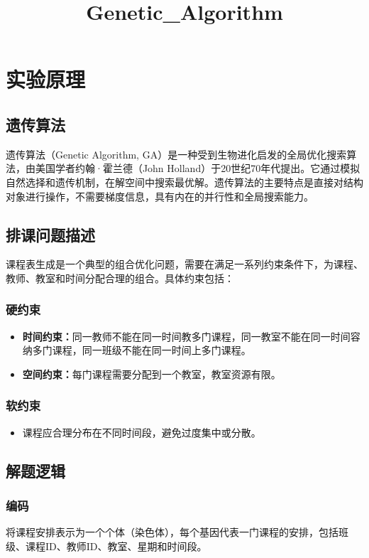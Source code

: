 \documentclass{ctexart}
\title{Genetic_Algorithm}
\author{}
\date{}
\begin{document}
	\large
	\maketitle
	\vspace{-50pt}
	\section{实验原理}
	\subsection{遗传算法}
	遗传算法（Genetic Algorithm, GA）是一种受到生物进化启发的全局优化搜索算法，由美国学者约翰·霍兰德（John Holland）于20世纪70年代提出。它通过模拟自然选择和遗传机制，在解空间中搜索最优解。遗传算法的主要特点是直接对结构对象进行操作，不需要梯度信息，具有内在的并行性和全局搜索能力。
	\subsection{排课问题描述}
	课程表生成是一个典型的组合优化问题，需要在满足一系列约束条件下，为课程、教师、教室和时间分配合理的组合。具体约束包括：
	\vspace{-10pt}
	\subsubsection{硬约束}
	\begin{itemize}[label=\textbullet]
		\item \textbf{时间约束：}同一教师不能在同一时间教多门课程，同一教室不能在同一时间容纳多门课程，同一班级不能在同一时间上多门课程。
		\item \textbf{空间约束：}每门课程需要分配到一个教室，教室资源有限。
	\end{itemize}
	\vspace{-20pt}
	\subsubsection{软约束}
	\begin{itemize}[label=\textbullet]
		\item 课程应合理分布在不同时间段，避免过度集中或分散。
	\end{itemize}
	
	\subsection{解题逻辑}
	\subsubsection{编码}
	将课程安排表示为一个个体（染色体），每个基因代表一门课程的安排，包括班级、课程ID、教师ID、教室、星期和时间段。
\end{document}
